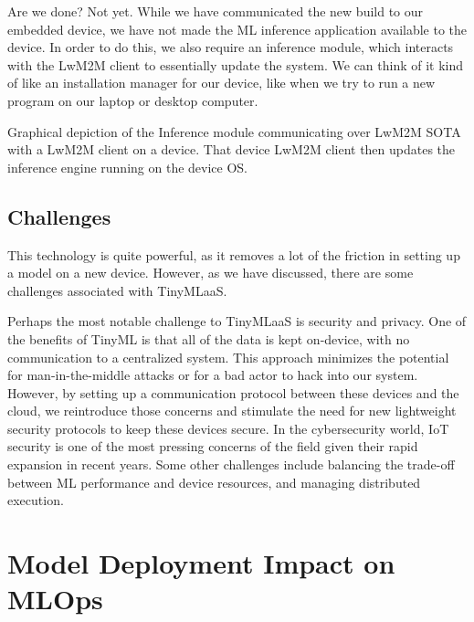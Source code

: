 {{{{{{    Are we done? Not yet. While we have communicated the new build to our embedded device, we have not made the ML inference application available to the device. In order to do this, we also require an inference module, which interacts with the LwM2M client to essentially update the system. We can think of it kind of like an installation manager for our device, like when we try to run a new program on our laptop or desktop computer.
    
    
    Graphical depiction of the Inference module communicating over LwM2M SOTA with a LwM2M client on a device. That device LwM2M client then updates the inference engine running on the device OS.
    
    \subsection{Challenges}
    
    This technology is quite powerful, as it removes a lot of the friction in setting up a model on a new device. However, as we have discussed, there are some challenges associated with TinyMLaaS. 
    
    Perhaps the most notable challenge to TinyMLaaS is security and privacy. One of the benefits of TinyML is that all of the data is kept on-device, with no communication to a centralized system. This approach minimizes the potential for man-in-the-middle attacks or for a bad actor to hack into our system. However, by setting up a communication protocol between these devices and the cloud, we reintroduce those concerns and stimulate the need for new lightweight security protocols to keep these devices secure. In the cybersecurity world, IoT security is one of the most pressing concerns of the field given their rapid expansion in recent years. Some other challenges include balancing the trade-off between ML performance and device resources, and managing distributed execution.

\section{Model Deployment Impact on MLOps}

}}}}}}
